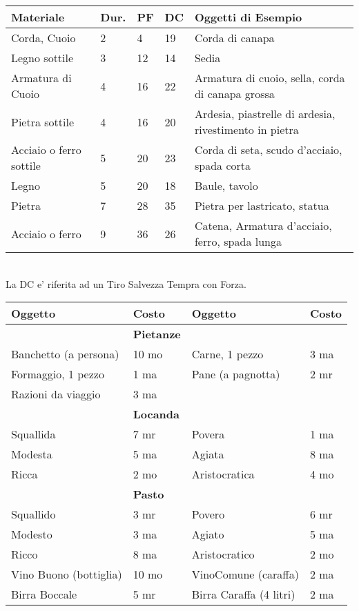 \documentclass[landscape,10pt,a4paper]{article}
\begin{document}
\pagebreak

\begin{multicols}{2}


\begin{dmbox}[title=Spaccare - pagina \pageref{durezzaoggetti}]

\noindent\begin{tabularx}{1\linewidth}{llllX}
\textbf{Materiale} &\textbf{Dur.}&\textbf{PF} &\textbf{DC} & \textbf{Oggetti di Esempio}\\
\toprule{}
Corda, Cuoio&2&4&19&Corda di canapa\\
Legno sottile&3&12&14&Sedia\\
Armatura di Cuoio &4&16&22&Armatura di cuoio, sella, corda di canapa grossa\\
Pietra sottile&4&16&20&Ardesia, piastrelle di ardesia, rivestimento in pietra\\
Acciaio o ferro sottile&5&20&23&Corda di seta, scudo d'acciaio, spada corta\\
Legno&5&20&18&Baule, tavolo\\
Pietra&7&28&35&Pietra per lastricato, statua\\
Acciaio o ferro&9&36&26&Catena, Armatura d'acciaio, ferro, spada lunga\\
\end{tabularx}\\

La DC e' riferita ad un Tiro Salvezza Tempra con Forza.

\end{dmbox}




\begin{dmbox}[title=Oggetti e Viveri - pagina \pageref{equipaggiamentolista}]

\noindent\begin{tabular}{ll|ll}
\textbf{Oggetto}&\textbf{Costo}&\textbf{Oggetto}&\textbf{Costo}\\
\hline
&\textbf{Pietanze} &&\\
Banchetto (a persona)&10 mo&Carne, 1 pezzo&3 ma\\
Formaggio, 1 pezzo&1 ma&Pane (a pagnotta)&2 mr\\
Razioni da viaggio& 3 ma &&\\
\hline
&\textbf{Locanda}&&\\
Squallida&7 mr&Povera&1 ma\\
Modesta&5 ma&Agiata&8 ma\\
Ricca&2 mo&Aristocratica&4 mo\\
\hline
&\textbf{Pasto}&&\\
Squallido&3 mr&Povero&6 mr\\
Modesto&3 ma&Agiato&5 ma\\
Ricco&8 ma&Aristocratico&2 mo\\
Vino Buono (bottiglia)&10 mo& VinoComune (caraffa)&2 ma\\
Birra Boccale&5 mr&Birra Caraffa (4 litri)&2 ma\\
\end{tabular}
\end{dmbox}





\end{multicols}
\end{document}
